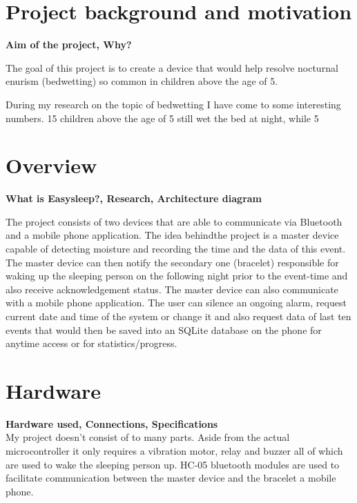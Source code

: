 \documentclass[12pt,a4paper]{article}
\begin{document}
	\section{Project background and motivation}
	{\bfseries Aim of the project, Why?}
	
	The goal of this project is to create a device that would help resolve nocturnal enurism (bedwetting) so common in children above the age of 5. 
	
	During my research on the topic of bedwetting I have come to some interesting numbers. 15%
	children above the age of 5 still wet the bed at night, while 5%
	\newpage
	
	\section{Overview}
	{\bfseries What is Easysleep?, Research, Architecture diagram}
	
	The project consists of two devices that are able to communicate via Bluetooth and a mobile phone application. The idea behindthe project is a master device capable of detecting moisture and recording the time and the data of this event. The master device can then notify the secondary one (bracelet) responsible for waking up the sleeping person on the following night prior to the event-time and also receive acknowledgement status. The master device can also communicate with a mobile phone application.  The user can silence an ongoing alarm, request current date and time of the system or change it and also request data of last ten events that would then be saved into an SQLite database on the phone for anytime access or for statistics/progress.
	\newpage
	
	\section{Hardware}
	{\bfseries Hardware used, Connections, Specifications}\\
	
	My project doesn't consist of to many parts. Aside from the actual microcontroller it only 
	requires a vibration motor, relay and buzzer all of which are used to wake the sleeping person  
	up. HC-05 bluetooth modules are used to facilitate communication between the master device and  
	the bracelet a mobile phone.
\end{document}
